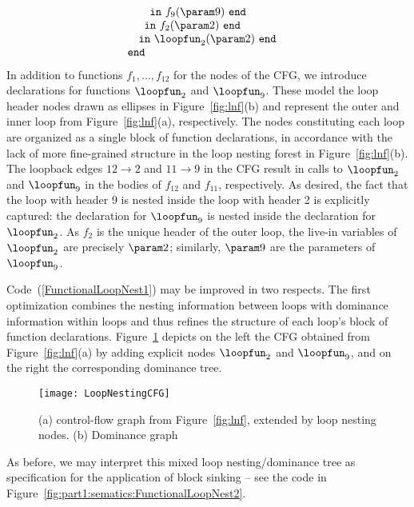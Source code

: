 \begin{equation}
\begin{array}{l}
\begin{array}{l}
\begin{array}[t]{l}
\begin{array}[t]{l}
\begin{array}[t]{l}
                             \mathtt{in}\ f_9(\param 9)\ \mathtt{end}
                          \end{array}\\
               \mathtt{in}\ f_2(\param 2)\ \mathtt{end}
             \end{array}\\
       \mathtt{in}\ \loopfun_2(\param 2)\ \mathtt{end}
     \end{array}
  \end{array}\\ 
\mathtt{end}
\end{array} 
\end{equation}
In addition to functions $f_1, \ldots, f_{12}$ for the nodes of the
CFG, we introduce declarations for functions $\loopfun_2$ and
$\loopfun_9$. These model the loop header nodes drawn as ellipses in
Figure~\ref{fig:lnf}(b) and represent the outer and inner loop from
Figure~\ref{fig:lnf}(a), respectively.  The nodes constituting each
loop are organized as a single block of function declarations, in
accordance with the lack of more fine-grained structure in the loop
nesting forest in Figure~\ref{fig:lnf}(b). The loopback edges $12 \to
2$ and $11 \to 9$ in the CFG result in calls to $\loopfun _2$ and
$\loopfun_9$ in the bodies of $f_{12}$ and $f_{11}$, respectively.  As
desired, the fact that the loop with header 9 is nested inside the
loop with header 2 is explicitly captured: the declaration for
$\loopfun_9$ is nested inside the declaration for $\loopfun_2$.  As
$f_2$ is the unique header of the outer loop, the live-in variables of
$\loopfun_2$ are precisely $\param 2$; similarly, $\param 9$ are the
parameters of $\loopfun_9$.

Code~(\ref{FunctionalLoopNest1}) may be improved in two respects. The
first optimization combines the nesting information between loops with
dominance information within loops and thus refines the structure of
each loop's block of function declarations.
Figure~\ref{FigureCFGForLoopNestFromChapter4} depicts on the left the
CFG obtained from Figure~\ref{fig:lnf}(a) by adding explicit nodes
$\loopfun_2$ and $\loopfun_9$, and on the right the corresponding
dominance tree.
\begin{figure}
\begin{center}
\texttt{[image: LoopNestingCFG]}
\end{center}
\caption{\label{FigureCFGForLoopNestFromChapter4} (a) control-flow graph from Figure~\ref{fig:lnf}, extended by loop nesting nodes. (b) Dominance graph}
\end{figure} As before, we may interpret
this mixed loop nesting/dominance tree as specification for the
application of block sinking -- see the code in
Figure~\ref{fig:part1:sematics:FunctionalLoopNest2}.

